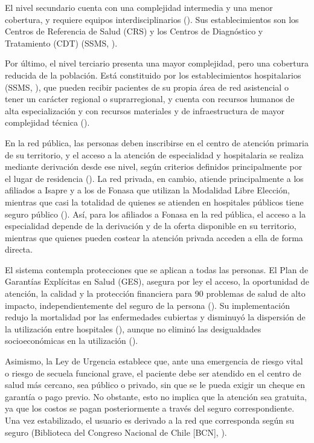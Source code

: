 \documentclass[
  spanish,
  a4paper,
  oneside]{scrbook}
\begin{document}
El nivel secundario cuenta con una complejidad intermedia y una menor
cobertura, y requiere equipos interdisciplinarios
(). Sus establecimientos
son los Centros de Referencia de Salud (CRS) y los Centros de
Diagnóstico y Tratamiento (CDT) (SSMS,
).

Por último, el nivel terciario presenta una mayor complejidad, pero una
cobertura reducida de la población. Está constituido por los
establecimientos hospitalarios (SSMS,
), que pueden recibir pacientes de su
propia área de red asistencial o tener un carácter regional o
suprarregional, y cuenta con recursos humanos de alta especialización y
con recursos materiales y de infraestructura de mayor complejidad
técnica ().

En la red pública, las personas deben inscribirse en el centro de
atención primaria de su territorio, y el acceso a la atención de
especialidad y hospitalaria se realiza mediante derivación desde ese
nivel, según criterios definidos principalmente por el lugar de
residencia (). La
red privada, en cambio, atiende principalmente a los afiliados a Isapre
y a los de Fonasa que utilizan la Modalidad Libre Elección, mientras que
casi la totalidad de quienes se atienden en hospitales públicos tiene
seguro público ().
Así, para los afiliados a Fonasa en la red pública, el acceso a la
especialidad depende de la derivación y de la oferta disponible en su
territorio, mientras que quienes pueden costear la atención privada
acceden a ella de forma directa.

El sistema contempla protecciones que se aplican a todas las personas.
El Plan de Garantías Explícitas en Salud (GES), asegura por ley el
acceso, la oportunidad de atención, la calidad y la protección
financiera para 90 problemas de salud de alto impacto,
independientemente del seguro de la persona
(). Su implementación redujo la mortalidad por las enfermedades
cubiertas y disminuyó la dispersión de la utilización entre hospitales
(), aunque no
eliminó las desigualdades socioeconómicas en la utilización
().

Asimismo, la Ley de Urgencia establece que, ante una emergencia de
riesgo vital o riesgo de secuela funcional grave, el paciente debe ser
atendido en el centro de salud más cercano, sea público o privado, sin
que se le pueda exigir un cheque en garantía o pago previo. No obstante,
esto no implica que la atención sea gratuita, ya que los costos se pagan
posteriormente a través del seguro correspondiente. Una vez
estabilizado, el usuario es derivado a la red que corresponda según su
seguro (Biblioteca del Congreso Nacional de Chile {[}BCN{]},
).
\end{document}
